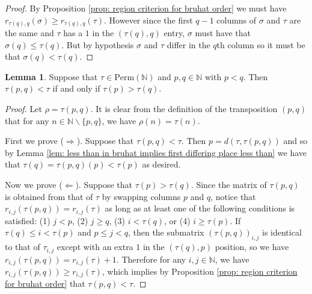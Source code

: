 \documentclass[oneside,11pt]{amsart}
\newcommand{\nn}{\ensuremath{\mathbb{N}}}
\newcommand{\Perm}{\ensuremath{\text{Perm}}}
\theoremstyle{definition}
\newtheorem{proof techniques}{Proof Techniques}
\newtheorem{lemma}{Lemma}
\begin{document}
\begin{proof}
By Proposition \ref{prop: region criterion for bruhat order} we must have $r_{\tau(q) , q}(\sigma) \geq r_{\tau(q) , q}(\tau)$. However since the first $q - 1$ columns of $\sigma$ and $\tau$ are the same and $\tau$ has a $1$ in the $(\tau(q) , q)$ entry, $\sigma$ must have that $\sigma(q) \leq \tau(q)$. But by hypothesis $\sigma$ and $\tau$ differ in the $q$th column so it must be that $\sigma(q) < \tau(q)$. 
\end{proof}


\begin{lemma} \label{lem: composing with a transposition in the bruhat order}
Suppose that $\tau \in \Perm(\nn)$ and $p , q \in \nn$ with $p < q$. Then $\tau (p , q) < \tau$ if and only if $\tau(p) > \tau(q)$. 
\end{lemma}

\begin{proof} Let $\rho = \tau (p , q)$. It is clear from the definition of the transposition $(p , q)$ that for any $n \in \nn \smallsetminus \{ p , q \}$, we have $\rho(n) = \tau(n)$. 

First we prove ($\Rightarrow$). Suppose that $\tau (p , q)  < \tau$. Then $p = d(\tau , \tau(p, q))$ and so by Lemma \ref{lem: less than in bruhat implies first differing place less than} we have that $\tau(q) = \tau (p , q) (p) < \tau(p)$ as desired. 

Now we prove ($\Leftarrow$). Suppose that $\tau(p) > \tau(q)$. Since the matrix of $\tau (p , q)$ is obtained from that of $\tau$ by swapping columns $p$ and $q$, notice that $r_{i, j}( \tau (p , q) ) = r_{i, j}(\tau)$ as long as at least one of the following conditions is satisfied: (1) $j < p$, (2) $j \geq q$, (3) $i < \tau(q)$, or (4) $i \geq \tau(p)$. If $\tau(q) \leq i < \tau(p)$ and $p \leq j < q$, then the submatrix $(\tau (p , q))_{i , j}$ is identical to that of $\tau_{i , j}$ except with an extra $1$ in the $(\tau(q) , p)$ position, so we have $r_{i, j}( \tau (p , q) ) = r_{i, j}(\tau) + 1$. Therefore for any $i , j \in \nn$, we have $r_{i, j}( \tau (p , q) ) \geq r_{i, j}(\tau)$, which implies by Proposition \ref{prop: region criterion for bruhat order} that $\tau (p , q) < \tau$. 
\end{proof}


\end{document}
